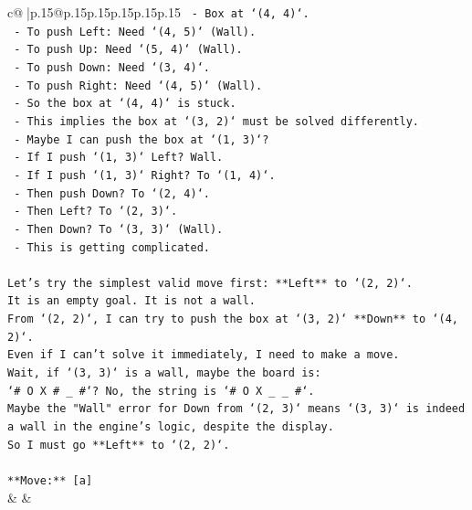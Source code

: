 \documentclass{article}
\begin{document}
{\begin{supertabular}{c@{$\;$}|p{.15\linewidth}@{}p{.15\linewidth}p{.15\linewidth}p{.15\linewidth}p{.15\linewidth}p{.15\linewidth}}
{{{\texttt{    {-} Box at `(4, 4)`.} \\
\texttt{    {-} To push Left: Need `(4, 5)` (Wall).} \\
\texttt{    {-} To push Up: Need `(5, 4)` (Wall).} \\
\texttt{    {-} To push Down: Need `(3, 4)`.} \\
\texttt{    {-} To push Right: Need `(4, 5)` (Wall).} \\
\texttt{    {-} So the box at `(4, 4)` is stuck.} \\
\texttt{    {-} This implies the box at `(3, 2)` must be solved differently.} \\
\texttt{    {-} Maybe I can push the box at `(1, 3)`?} \\
\texttt{    {-} If I push `(1, 3)` Left? Wall.} \\
\texttt{    {-} If I push `(1, 3)` Right? To `(1, 4)`.} \\
\texttt{    {-} Then push Down? To `(2, 4)`.} \\
\texttt{    {-} Then Left? To `(2, 3)`.} \\
\texttt{    {-} Then Down? To `(3, 3)` (Wall).} \\
\texttt{    {-} This is getting complicated.} \\
\\ 
\texttt{Let's try the simplest valid move first: **Left** to `(2, 2)`.} \\
\texttt{It is an empty goal. It is not a wall.} \\
\texttt{From `(2, 2)`, I can try to push the box at `(3, 2)` **Down** to `(4, 2)`.} \\
\texttt{Even if I can't solve it immediately, I need to make a move.} \\
\texttt{Wait, if `(3, 3)` is a wall, maybe the board is:} \\
\texttt{`\# O X \# \_ \#`? No, the string is `\# O X \_ \_ \#`.} \\
\texttt{Maybe the "Wall" error for Down from `(2, 3)` means `(3, 3)` is indeed a wall in the engine's logic, despite the display.} \\
\texttt{So I must go **Left** to `(2, 2)`.} \\
\\ 
\texttt{**Move:** {[}a{]}} \\
            }
        }
    }
    & & \\ \\


\end{supertabular}}
\end{document}
